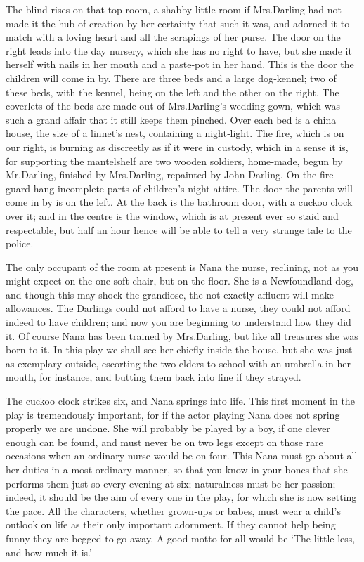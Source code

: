 \begin{stagedir}
The blind
rises on that top room,
a shabby little room if Mrs.\@ Darling had not made it the hub of creation by her certainty that such it was,
and adorned it to match with a loving heart and all the scrapings of her purse.
The door on the right leads into the day nursery,
which she has no right to have, but she made it herself with nails in her mouth and a paste‐pot in her hand.
This is the door the children will come in by.
There are three beds and  a large dog‐kennel;
two of these beds, with the kennel, being on the left and the other on the right.
The coverlets of the beds  are made out of Mrs.\@ Darling’s wedding‐gown,
which was such a grand affair that it still keeps them pinched.
Over each bed is a china house, the size of a linnet’s nest, containing a night‐light.
The fire, which is on our right, is burning as discreetly as if it were in custody,
which in a sense it is, for supporting the mantelshelf are two wooden soldiers, home‐made,
begun by Mr.\@ Darling, finished by Mrs.\@ Darling, repainted  by John Darling.
On the fire‐guard hang incomplete parts of children’s night attire.
The door the parents will come in by is on the left.
At the back is the bathroom door, with a cuckoo clock over it;
and in the centre is the window, which is at present ever so staid and respectable,
but half an hour hence  will be able to tell a very strange tale to the police.

The only occupant of the room at present is Nana the nurse,
reclining, not as you might expect on the one soft chair, but on the floor.
She is a Newfoundland dog, and though this may shock the grandiose,
the not exactly affluent will make allowances.
The Darlings could not afford to have a nurse,
they could not afford indeed to have children;
and now you are beginning to understand how they did it.
Of course Nana has been trained by Mrs.\@ Darling,
but like all treasures she was born to it.
In this play we shall see her chiefly inside the house,
but she was just as exemplary outside,
escorting the two elders to school with an umbrella in her mouth, for instance,
and butting them back into line if they strayed.

The cuckoo clock strikes six, and Nana springs into life.
This first moment in the play is tremendously important,
for if the actor playing Nana does not spring properly we are undone.
She will probably be played by a boy, if one clever enough can be found,
and must never be on two legs except on those rare occasions when an ordinary nurse would be on four.
This Nana must go about all her duties in a most ordinary manner,
so that you know in your bones that she performs them just so every evening at six;
naturalness must be her passion;
indeed, it should be the aim of every one in the play, for which she is now setting the pace.
All the characters, whether grown‐ups or babes,
must wear a child’s outlook on life as their only important adornment.
If they cannot help being funny they are begged to go away.
A good motto for all would be ‘The little less, and how much it is.’


\end{stagedir}
